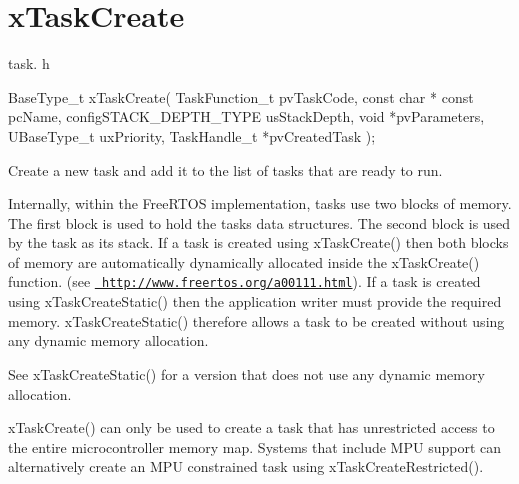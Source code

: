 \hypertarget{group__x_task_create}{}\section{x\+Task\+Create}
\label{group__x_task_create}
task. h 
\begin{DoxyPre}
BaseType\_t xTaskCreate(
                          TaskFunction\_t pvTaskCode,
                          const char * const pcName,
                          configSTACK\_DEPTH\_TYPE usStackDepth,
                          void *pvParameters,
                          UBaseType\_t uxPriority,
                          TaskHandle\_t *pvCreatedTask
                      );\end{DoxyPre}


Create a new task and add it to the list of tasks that are ready to run.

Internally, within the Free\+R\+T\+OS implementation, tasks use two blocks of memory. The first block is used to hold the task\textquotesingle{}s data structures. The second block is used by the task as its stack. If a task is created using x\+Task\+Create() then both blocks of memory are automatically dynamically allocated inside the x\+Task\+Create() function. (see \href{http://www.freertos.org/a00111.html}{\texttt{ http\+://www.\+freertos.\+org/a00111.\+html}}). If a task is created using x\+Task\+Create\+Static() then the application writer must provide the required memory. x\+Task\+Create\+Static() therefore allows a task to be created without using any dynamic memory allocation.

See x\+Task\+Create\+Static() for a version that does not use any dynamic memory allocation.

x\+Task\+Create() can only be used to create a task that has unrestricted access to the entire microcontroller memory map. Systems that include M\+PU support can alternatively create an M\+PU constrained task using x\+Task\+Create\+Restricted().


